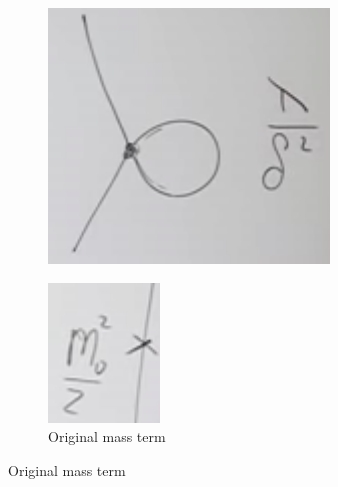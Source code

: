 \documentclass[]{article}
\begin{document}
\begin{figure}[H]
\begin{subfigure}[t]{0.32\textwidth}
		\includegraphics[width=\textwidth]{3-1-cutoff}
	\end{subfigure}
		\begin{subfigure}[t]{0.32\textwidth}
		\caption{Original mass term}\label{fig:3-1-original}
		\includegraphics[width=\textwidth]{3-1-original}
	\end{subfigure}
\end{figure}
\end{document}
